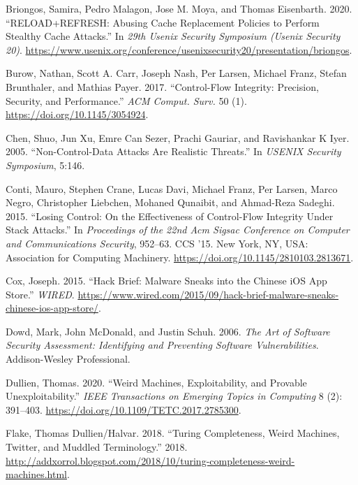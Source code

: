 \documentclass[a4paper,]{report}
\begin{document}
\leavevmode\hypertarget{ref-Briongos2020}{}%
Briongos, Samira, Pedro Malagon, Jose M. Moya, and Thomas Eisenbarth.
2020. ``RELOAD+REFRESH: Abusing Cache Replacement Policies to Perform
Stealthy Cache Attacks.'' In \emph{29th Usenix Security Symposium
(Usenix Security 20)}.
\url{https://www.usenix.org/conference/usenixsecurity20/presentation/briongos}.

\leavevmode\hypertarget{ref-Burow2017}{}%
Burow, Nathan, Scott A. Carr, Joseph Nash, Per Larsen, Michael Franz,
Stefan Brunthaler, and Mathias Payer. 2017. ``Control-Flow Integrity:
Precision, Security, and Performance.'' \emph{ACM Comput. Surv.} 50 (1).
\url{https://doi.org/10.1145/3054924}.

\leavevmode\hypertarget{ref-Chen2005}{}%
Chen, Shuo, Jun Xu, Emre Can Sezer, Prachi Gauriar, and Ravishankar K
Iyer. 2005. ``Non-Control-Data Attacks Are Realistic Threats.'' In
\emph{USENIX Security Symposium}, 5:146.

\leavevmode\hypertarget{ref-Conti2015}{}%
Conti, Mauro, Stephen Crane, Lucas Davi, Michael Franz, Per Larsen,
Marco Negro, Christopher Liebchen, Mohaned Qunaibit, and Ahmad-Reza
Sadeghi. 2015. ``Losing Control: On the Effectiveness of Control-Flow
Integrity Under Stack Attacks.'' In \emph{Proceedings of the 22nd Acm
Sigsac Conference on Computer and Communications Security}, 952--63. CCS
'15. New York, NY, USA: Association for Computing Machinery.
\url{https://doi.org/10.1145/2810103.2813671}.

\leavevmode\hypertarget{ref-Cox2015}{}%
Cox, Joseph. 2015. ``Hack Brief: Malware Sneaks into the Chinese iOS App
Store.'' \emph{WIRED}.
\url{https://www.wired.com/2015/09/hack-brief-malware-sneaks-chinese-ios-app-store/}.

\leavevmode\hypertarget{ref-Dowd2006}{}%
Dowd, Mark, John McDonald, and Justin Schuh. 2006. \emph{The Art of
Software Security Assessment: Identifying and Preventing Software
Vulnerabilities}. Addison-Wesley Professional.

\leavevmode\hypertarget{ref-Dullien2020}{}%
Dullien, Thomas. 2020. ``Weird Machines, Exploitability, and Provable
Unexploitability.'' \emph{IEEE Transactions on Emerging Topics in
Computing} 8 (2): 391--403.
\url{https://doi.org/10.1109/TETC.2017.2785300}.

\leavevmode\hypertarget{ref-Dullien2018}{}%
Flake, Thomas Dullien/Halvar. 2018. ``Turing Completeness, Weird
Machines, Twitter, and Muddled Terminology.'' 2018.
\url{http://addxorrol.blogspot.com/2018/10/turing-completeness-weird-machines.html}.
\end{document}
